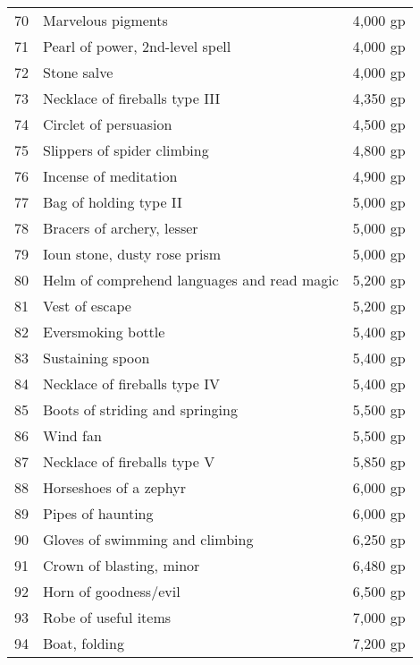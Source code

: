 \begin{xtabular}{lll}
70  & Marvelous pigments                          & 4,000 gp     \\
71  & Pearl of power, 2nd-level spell             & 4,000 gp     \\
72  & Stone salve                                 & 4,000 gp     \\
73  & Necklace of fireballs type III              & 4,350 gp     \\
74  & Circlet of persuasion                       & 4,500 gp     \\
75  & Slippers of spider climbing                 & 4,800 gp     \\
76  & Incense of meditation                       & 4,900 gp     \\
77  & Bag of holding type II                      & 5,000 gp     \\
78  & Bracers of archery, lesser                  & 5,000 gp     \\
79  & Ioun stone, dusty rose prism                & 5,000 gp     \\
80  & Helm of comprehend languages and read magic & 5,200 gp     \\
81  & Vest of escape                              & 5,200 gp     \\
82  & Eversmoking bottle                          & 5,400 gp     \\
83  & Sustaining spoon                            & 5,400 gp     \\
84  & Necklace of fireballs type IV               & 5,400 gp     \\
85  & Boots of striding and springing             & 5,500 gp     \\
86  & Wind fan                                    & 5,500 gp     \\
87  & Necklace of fireballs type V                & 5,850 gp     \\
88  & Horseshoes of a zephyr                      & 6,000 gp     \\
89  & Pipes of haunting                           & 6,000 gp     \\
90  & Gloves of swimming and climbing             & 6,250 gp     \\
91  & Crown of blasting, minor                    & 6,480 gp     \\
92  & Horn of goodness/evil                       & 6,500 gp     \\
93  & Robe of useful items                        & 7,000 gp     \\
94  & Boat, folding                               & 7,200 gp     \\

\end{xtabular}
